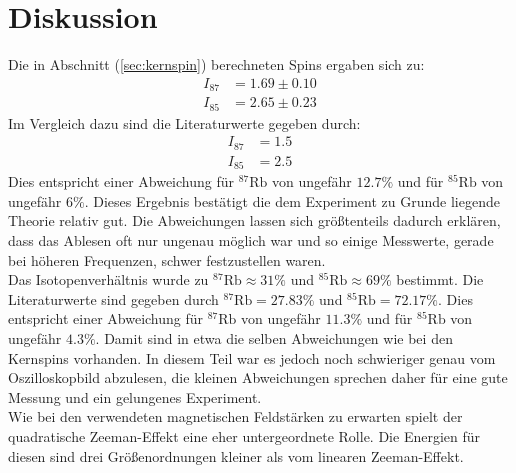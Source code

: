 \section{Diskussion}
\label{sec:Diskussion}
Die in Abschnitt (\ref{sec:kernspin}) berechneten Spins ergaben sich zu:
\begin{align*}
  I_\mathrm{87} &= 1.69\pm0.10 \\
  I_\mathrm{85} &= 2.65\pm0.23
\end{align*}
Im Vergleich dazu sind die Literaturwerte \cite{Anleitung3} gegeben durch:
\begin{align*}
  I_\mathrm{87} &= 1.5 \\
  I_\mathrm{85} &= 2.5
\end{align*}
Dies entspricht einer Abweichung für $^{87}\mathrm{Rb}$ von ungefähr $12.7\%$ und für $^{85}\mathrm{Rb}$ von ungefähr $6\%$. Dieses Ergebnis bestätigt die dem Experiment zu Grunde liegende
Theorie relativ gut. Die Abweichungen lassen sich größtenteils dadurch erklären, dass das Ablesen oft nur ungenau möglich war und so einige Messwerte, gerade bei höheren Frequenzen, schwer festzustellen waren.\\
Das Isotopenverhältnis wurde zu $^{87}\mathrm{Rb} \approx 31\%$ und $^{85}\mathrm{Rb} \approx 69\%$ bestimmt. Die Literaturwerte \cite{Anleitung3} sind gegeben durch $^{87}\mathrm{Rb} = 27.83\%$ und $^{85}\mathrm{Rb} = 72.17\%$.
Dies entspricht einer Abweichung für $^{87}\mathrm{Rb}$ von ungefähr $11.3\%$ und für $^{85}\mathrm{Rb}$ von ungefähr $4.3\%$. Damit sind in etwa die selben Abweichungen wie bei den Kernspins vorhanden. In diesem Teil war es jedoch noch
schwieriger genau vom Oszilloskopbild abzulesen, die kleinen Abweichungen sprechen daher für eine gute Messung und ein gelungenes Experiment.\\
Wie bei den verwendeten magnetischen Feldstärken zu erwarten spielt der quadratische Zeeman-Effekt eine eher untergeordnete Rolle. Die Energien für diesen sind drei Größenordnungen kleiner als vom linearen Zeeman-Effekt.
